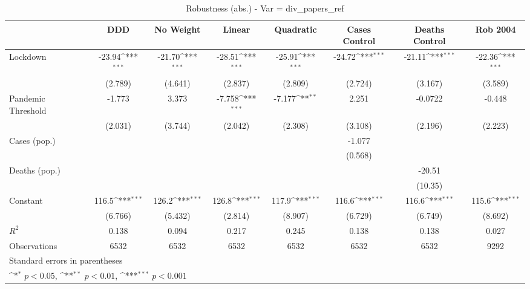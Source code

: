 \documentclass{article}
\begin{document}
{
\def\sym#1{\ifmmode^{#1}\else\(^{#1}\)\fi}
\begin{longtable}{l*{7}{c}}
\caption{Robustness (abs.) - Var = div\_papers\_ref}\\
\hline\hline\endfirsthead\hline\endhead\hline\endfoot\endlastfoot
                &\multicolumn{1}{c}{DDD}&\multicolumn{1}{c}{No Weight}&\multicolumn{1}{c}{Linear}&\multicolumn{1}{c}{Quadratic}&\multicolumn{1}{c}{Cases Control}&\multicolumn{1}{c}{Deaths Control}&\multicolumn{1}{c}{Rob 2004}\\
\hline
Lockdown        &   -23.94\sym{***}&   -21.70\sym{***}&   -28.51\sym{***}&   -25.91\sym{***}&   -24.72\sym{***}&   -21.11\sym{***}&   -22.36\sym{***}\\
                &  (2.789)         &  (4.641)         &  (2.837)         &  (2.809)         &  (2.724)         &  (3.167)         &  (3.589)         \\
Pandemic Threshold&   -1.773         &    3.373         &   -7.758\sym{***}&   -7.177\sym{**} &    2.251         &  -0.0722         &   -0.448         \\
                &  (2.031)         &  (3.744)         &  (2.042)         &  (2.308)         &  (3.108)         &  (2.196)         &  (2.223)         \\
Cases (pop.)    &                  &                  &                  &                  &   -1.077         &                  &                  \\
                &                  &                  &                  &                  &  (0.568)         &                  &                  \\
Deaths (pop.)   &                  &                  &                  &                  &                  &   -20.51         &                  \\
                &                  &                  &                  &                  &                  &  (10.35)         &                  \\
Constant        &    116.5\sym{***}&    126.2\sym{***}&    126.8\sym{***}&    117.9\sym{***}&    116.6\sym{***}&    116.6\sym{***}&    115.6\sym{***}\\
                &  (6.766)         &  (5.432)         &  (2.814)         &  (8.907)         &  (6.729)         &  (6.749)         &  (8.692)         \\
\hline
\(R^{2}\)       &    0.138         &    0.094         &    0.217         &    0.245         &    0.138         &    0.138         &    0.027         \\
Observations    &     6532         &     6532         &     6532         &     6532         &     6532         &     6532         &     9292         \\
\hline\hline
\multicolumn{8}{l}{\footnotesize Standard errors in parentheses}\\
\multicolumn{8}{l}{\footnotesize \sym{*} \(p<0.05\), \sym{**} \(p<0.01\), \sym{***} \(p<0.001\)}\\
\end{longtable}
}
\end{document}
